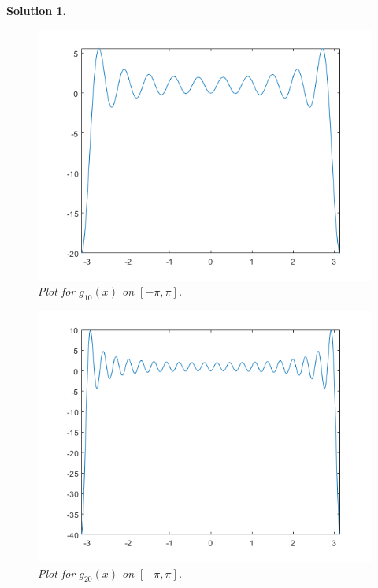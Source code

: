 \documentclass[leqno]{article}
\theoremstyle{nonumberplain}
\newtheorem{solution}{Solution}
\begin{document}
\begin{solution}
\begin{figure}[h]
    \centering
    \includegraphics{problem_3_5_hw_5.png}
    \caption{Plot for $g_{10}(x)$ on $[-\pi,\pi]$.}
    \label{fig:my_label}
\end{figure}
\pagebreak

\begin{figure}[h]
    \centering
    \includegraphics{problem_3_6_hw_5.png}
    \caption{Plot for $g_{20}(x)$ on $[-\pi,\pi]$.}
    \label{fig:my_label}
\end{figure}
\pagebreak


\end{solution}
\end{document}
